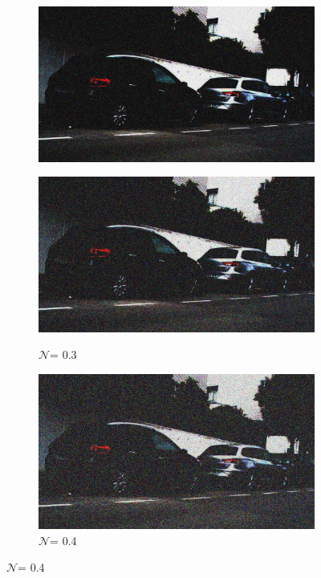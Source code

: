 \documentclass[a4paper]{ctexart}
\begin{document}
\begin{figure}[htbp]
\begin{subfigure}{0.08\textwidth}
			\includegraphics[width=\linewidth]{picture/Edge Detection/degrade/RGB_001 Gamma=0.1, Gauss Noise=0.2}
			\label{fig：Gamma=0.1, Gauss Noise = 0.2}
		\end{subfigure}
		\begin{subfigure}{0.08\textwidth}
			\captionsetup{font=scriptsize}
			\caption*{$\mathcal{N}$= 0.3}
			\includegraphics[width=\linewidth]{picture/Edge Detection/degrade/RGB_001 Gamma=0.1, Gauss Noise=0.3}
			\label{fig：Gamma=0.1, Gauss Noise = 0.3}
		\end{subfigure}
		\begin{subfigure}{0.08\textwidth}
			\captionsetup{font=scriptsize}
			\caption*{$\mathcal{N}$= 0.4}
			\includegraphics[width=\linewidth]{picture/Edge Detection/degrade/RGB_001 Gamma=0.1, Gauss Noise=0.4}

\end{subfigure}
\end{figure}
\end{document}
